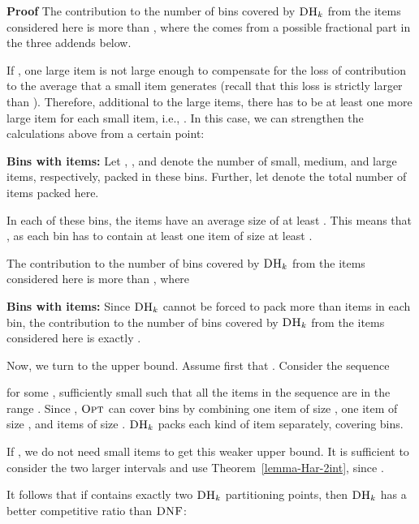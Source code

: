 \documentclass[11pt]{article}
\newenvironment{proof}{\begin{trivlist}\item[]{\bf Proof }}{\hspace*{\fill}\raisebox{-1pt}{\boldmath}\end{trivlist}}
\newcommand{\OPT}{\ensuremath{\operatorname{\textsc{Opt}}}\xspace}
\newcommand{\DNF}{\ensuremath{\operatorname{\textsc{DNF}}}\xspace}
\newcommand{\DHk}{{\ensuremath{\textsc{DH}_k}}\xspace}
\begin{document}
\begin{proof}
The contribution to the number of bins covered by \DHk from the 
items considered here is more than , where the  comes from
a possible fractional part in the three addends below.


 
If , 
 one large item is not large enough to compensate for the loss of contribution
to the average that a small item generates (recall that this loss is
strictly larger than ). Therefore,
additional to the  large 
items, there has to be at least one more large item for each small
item, i.e., .
In this case, we can strengthen the calculations above from a certain point:


{\bf Bins with  items:}
Let , , and  denote the number of small, medium, and
 large items, respectively, packed in these  bins.
Further, let  denote the total
 number of items packed here.
 
 In each of these bins, the items have an average size of at least
.
This means that , as each bin has to contain at least one item of size at least . 

The contribution to the number of bins covered by \DHk from the 
items considered here is more than , where


{\bf Bins with  items:}
Since \DHk cannot be forced to pack more than  items in each bin,
the contribution to the number of bins covered by \DHk from the
items considered here is exactly .
 

Now, we turn to the upper bound.
Assume first that .
Consider the sequence

for some ,
sufficiently small such that all the items in the sequence are in
the range .
Since ,
\OPT can cover  bins by combining one
item of size , one item of size 
, and  items of size
. 
\DHk packs each kind of item
separately, covering  bins. 
 
If ,
 we do not need small items to get this weaker upper bound.
 It is sufficient to consider the two larger intervals and use Theorem~\ref{lemma-Har-2int}, 
 since .
\end{proof}


It follows that if  contains exactly two \DHk partitioning
points, then \DHk has a better competitive ratio than \DNF:
\end{document}
